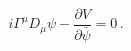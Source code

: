 \begin{equation}\label{eq:Dirac}
  i \Gamma^\mu D_\mu \psi-\frac{\partial V}{\partial \bar{\psi}}=0 \, .
\end{equation}

